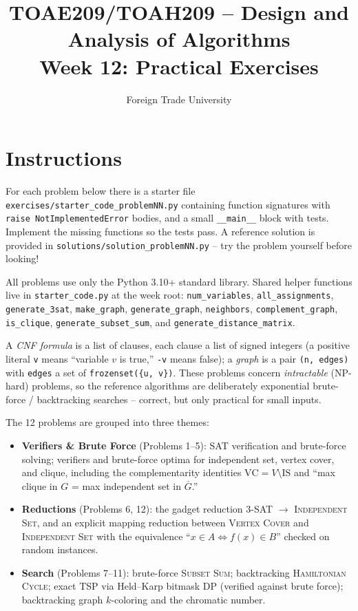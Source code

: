 \documentclass[11pt]{article}
\title{TOAE209/TOAH209 -- Design and Analysis of Algorithms\\[4pt]
\large Week 12: Practical Exercises}
\author{Foreign Trade University}
\date{}
\begin{document}
\maketitle

\section*{Instructions}

For each problem below there is a starter file
\texttt{exercises/starter\_code\_problemNN.py} containing function signatures with
\texttt{raise NotImplementedError} bodies, and a small \texttt{\_\_main\_\_} block with
tests. Implement the missing functions so the tests pass. A reference solution is
provided in \texttt{solutions/solution\_problemNN.py} -- try the problem yourself before
looking!

All problems use only the Python 3.10+ standard library. Shared helper functions live in
\texttt{starter\_code.py} at the week root: \texttt{num\_variables},
\texttt{all\_assignments}, \texttt{generate\_3sat}, \texttt{make\_graph},
\texttt{generate\_graph}, \texttt{neighbors}, \texttt{complement\_graph},
\texttt{is\_clique}, \texttt{generate\_subset\_sum}, and
\texttt{generate\_distance\_matrix}.

A \emph{CNF formula} is a list of clauses, each clause a list of signed integers (a
positive literal \texttt{v} means ``variable $v$ is true,'' \texttt{-v} means false); a
\emph{graph} is a pair \texttt{(n, edges)} with \texttt{edges} a set of
\texttt{frozenset(\{u, v\})}. These problems concern \emph{intractable} (NP-hard) problems,
so the reference algorithms are deliberately exponential brute-force / backtracking
searches -- correct, but only practical for small inputs.

The 12 problems are grouped into three themes:
\begin{itemize}
    \item \textbf{Verifiers \& Brute Force} (Problems 1--5): SAT verification and brute-force
    solving; verifiers and brute-force optima for independent set, vertex cover, and clique,
    including the complementarity identities $\mathrm{VC} = V \setminus \mathrm{IS}$ and
    ``max clique in $G$ = max independent set in $\overline{G}$.''
    \item \textbf{Reductions} (Problems 6, 12): the gadget reduction \textsc{3-SAT} $\to$
    \textsc{Independent Set}, and an explicit mapping reduction between \textsc{Vertex
    Cover} and \textsc{Independent Set} with the equivalence ``$x \in A \iff f(x) \in B$''
    checked on random instances.
    \item \textbf{Search} (Problems 7--11): brute-force \textsc{Subset Sum}; backtracking
    \textsc{Hamiltonian Cycle}; exact \textsc{TSP} via Held--Karp bitmask DP (verified
    against brute force); backtracking graph $k$-coloring and the chromatic number.
\end{itemize}
\end{document}
